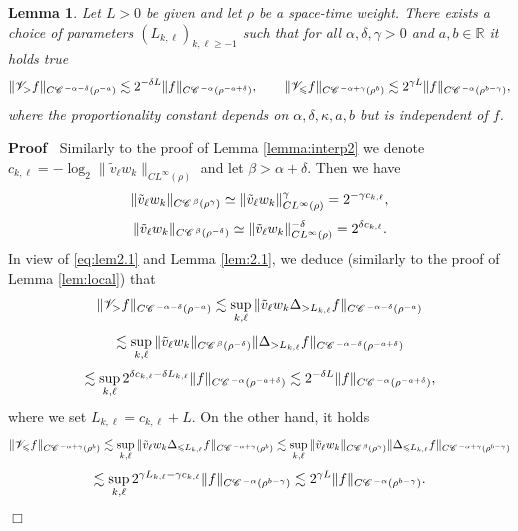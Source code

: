\documentclass[a4paper,11pt]{article}
\renewcommand{\geq}{\geqslant}
\newenvironment{proof}{\noindent\textbf{Proof\ }}{\hspace*{\fill}$\Box$\medskip}
\newtheorem{lemma}[theorem]{Lemma}
\numberwithin{equation}{section}
\newcommand{\CC}{\mathscr{C} \hspace{.1em}}
\newcommand{\VV}{\mathscr{V}}
\newcommand{\R}{\mathbb{R}}
\newcommand{\8}{\infty}
\begin{document}
\begin{lemma}\label{lem:local2}
Let $L>0$ be given and  let $\rho$ be a space-time weight. There exists a  choice of parameters $(L_{k,\ell})_{k,\ell\geq -1}$ such that for all $\alpha,\delta,\gamma>0$ and $a,b\in\R$ it holds true
      \[ \| \VV_{>} f \|_{C\CC^{- \alpha - \delta} (\rho^{- a})} \lesssim 2^{- \delta L} \| f \|_{C\CC^{- \alpha}
     (\rho^{-a+\delta})}, \qquad \| \VV_{\leqslant} f \|_{C\CC^{-\alpha+\gamma}
     (\rho^{b})} \lesssim 2^{\gamma
     L} \| f \|_{C\CC^{- \alpha} (\rho^{b-\gamma})}, \]
          where the proportionality constant depends on $\alpha,\delta,\kappa,a,b$ but is independent of $f$.
\end{lemma}

\begin{proof}
Similarly to the proof of Lemma \ref{lemma:interp2} we denote $c_{k,\ell} = - \log_2 \|\tilde v_{\ell}  w_k \|_{CL^{\infty} (\rho)}$ and let $\beta>\alpha+\delta$.
  Then we have
  \[ \|\tilde v_{\ell}  w_k \|_{C\CC^{\beta} (\rho^{\gamma})} \simeq \|\tilde v_{\ell}  w_k \|_{CL^{\infty}
     (\rho)}^{\gamma} = 2^{- \gamma c_{k,\ell}}, \]
  \[ \|\tilde v_{\ell}  w_k \|_{C\CC^{\beta} (\rho^{- \delta})} \simeq \|\tilde v_{\ell}  w_k
     \|_{CL^{\infty} (\rho)}^{- \delta} = 2^{\delta c_{k,\ell}} . \]
In view of  \eqref{eq:lem2.1} and Lemma \ref{lem:2.1}, we deduce (similarly to the proof of Lemma \ref{lem:local}) that
  \[ \| \VV_{>} f \|_{C\CC^{- \alpha - \delta} (\rho^{- a})} \lesssim
     \sup_{k,\ell} \|\tilde v_{\ell}  w_k \Delta_{> L_{k,\ell}} f \|_{C\CC^{- \alpha - \delta} (\rho^{- a})}
    \]
    \[ \lesssim \sup_{k,\ell} \|\tilde v_{\ell}  w_k \|_{C\CC^{\beta} (\rho^{-\delta})}
     \| \Delta_{> L_{k,\ell}} f \|_{C\CC^{- \alpha - \delta} (\rho^{-a+\delta})} \]
  \[ \lesssim \sup_{k,\ell} 2^{\delta c_{k,\ell} - \delta L_{k,\ell}} \| f \|_{C\CC^{- \alpha}
     (\rho^{-a+\delta})} \lesssim 2^{- \delta L} \| f \|_{C\CC^{- \alpha}
     (\rho^{-a+\delta})}, \]
where we set $L_{k,\ell} =  c_{k,\ell}+ L$.
  On the other hand, it holds
  \[ \| \VV_{\leqslant} f \|_{C\CC^{-\alpha+\gamma} (\rho^b)} \lesssim \sup_{k,\ell}
     \|\tilde v_{\ell}  w_k \Delta_{\leqslant L_{k,\ell}} f \|_{C\CC^{-\alpha+\gamma} (\rho^b)} \lesssim
     \sup_{k,\ell} \|\tilde v_{\ell}  w_k \|_{C\CC^{\beta} (\rho^{\gamma})} \| \Delta_{\leqslant
     L_{k,\ell}} f \|_{C\CC^{-\alpha+\gamma} (\rho^{b-\gamma})} \]
  \[ \lesssim \sup_{k,\ell} 2^{\gamma L_{k,\ell} - \gamma c_{k,\ell}} \| f
     \|_{C\CC^{- \alpha} (\rho^{b-\gamma})} \lesssim 2^{\gamma L} \| f \|_{C\CC^{- \alpha}
     (\rho^{b-\gamma})}.\]
\end{proof}
\end{document}
